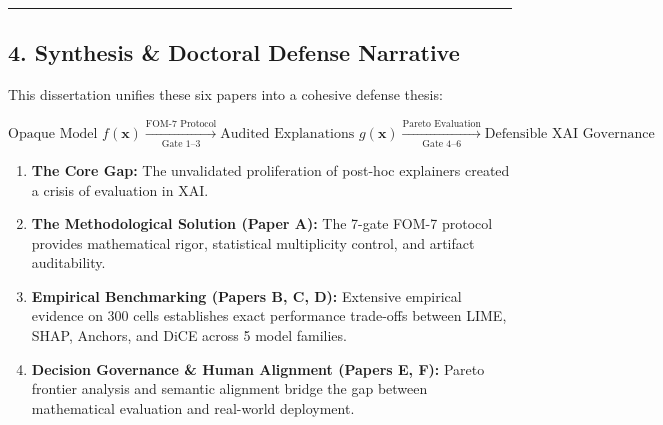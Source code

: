 \documentclass[
]{article}
\providecommand{\tightlist}{%
  \setlength{\itemsep}{0pt}\setlength{\parskip}{0pt}}
\begin{document}
\begin{center}\rule{0.5\linewidth}{0.5pt}\end{center}

\subsection{4. Synthesis \& Doctoral Defense
Narrative}\label{synthesis-doctoral-defense-narrative}

This dissertation unifies these six papers into a cohesive defense
thesis:

\[\text{Opaque Model } f(\mathbf{x}) \xrightarrow[\text{Gate 1--3}]{\text{FOM-7 Protocol}} \text{Audited Explanations } g(\mathbf{x}) \xrightarrow[\text{Gate 4--6}]{\text{Pareto Evaluation}} \text{Defensible XAI Governance}\]

\begin{enumerate}
\def\labelenumi{\arabic{enumi}.}
\tightlist
\item
  \textbf{The Core Gap:} The unvalidated proliferation of post-hoc
  explainers created a crisis of evaluation in XAI.
\item
  \textbf{The Methodological Solution (Paper A):} The 7-gate FOM-7
  protocol provides mathematical rigor, statistical multiplicity
  control, and artifact auditability.
\item
  \textbf{Empirical Benchmarking (Papers B, C, D):} Extensive empirical
  evidence on 300 cells establishes exact performance trade-offs between
  LIME, SHAP, Anchors, and DiCE across 5 model families.
\item
  \textbf{Decision Governance \& Human Alignment (Papers E, F):} Pareto
  frontier analysis and semantic alignment bridge the gap between
  mathematical evaluation and real-world deployment.
\end{enumerate}
\end{document}

